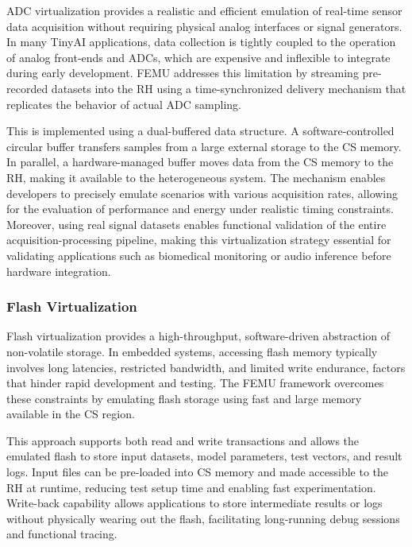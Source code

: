                     ADC virtualization provides a realistic and efficient emulation of real-time sensor data acquisition without requiring physical analog interfaces or signal generators. In many TinyAI applications, data collection is tightly coupled to the operation of analog front-ends and ADCs, which are expensive and inflexible to integrate during early development. \mbox{FEMU} addresses this limitation by streaming pre-recorded datasets into the RH using a time-synchronized delivery mechanism that replicates the behavior of actual ADC sampling.
                    
                    This is implemented using a dual-buffered data structure. A software-controlled circular buffer transfers samples from a large external storage to the CS memory. In parallel, a hardware-managed buffer moves data from the CS memory to the RH, making it available to the heterogeneous system. The mechanism enables developers to precisely emulate scenarios with various acquisition rates, allowing for the evaluation of performance and energy under realistic timing constraints. Moreover, using real signal datasets enables functional validation of the entire acquisition-processing pipeline, making this virtualization strategy essential for validating applications such as biomedical monitoring or audio inference before hardware integration.
                
                \subsubsection*{Flash Virtualization}
                    
                    Flash virtualization provides a high-throughput, software-driven abstraction of non-volatile storage. In embedded systems, accessing flash memory typically involves long latencies, restricted bandwidth, and limited write endurance, factors that hinder rapid development and testing. The \mbox{FEMU} framework overcomes these constraints by emulating flash storage using fast and large memory available in the CS region.
                    
                    This approach supports both read and write transactions and allows the emulated flash to store input datasets, model parameters, test vectors, and result logs. Input files can be pre-loaded into CS memory and made accessible to the RH at runtime, reducing test setup time and enabling fast experimentation. Write-back capability allows applications to store intermediate results or logs without physically wearing out the flash, facilitating long-running debug sessions and functional tracing.
                    
